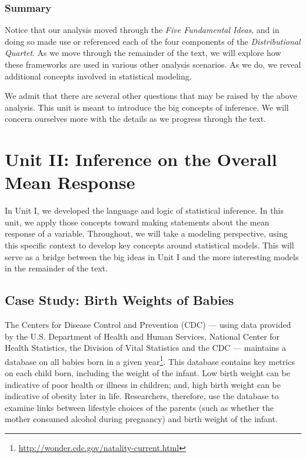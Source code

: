 \documentclass[
  letterpaper,
  DIV=11,
  numbers=noendperiod]{scrreprt}
\theoremstyle{plain}
\theoremstyle{definition}
\theoremstyle{definition}
\theoremstyle{remark}
\begin{document}
\hypertarget{summary}{%
\section{Summary}\label{summary}}

Notice that our analysis moved through the \emph{Five Fundamental
Ideas}, and in doing so made use or referenced each of the four
components of the \emph{Distributional Quartet}. As we move through the
remainder of the text, we will explore how these frameworks are used in
various other analysis scenarios. As we do, we reveal additional
concepts involved in statistical modeling.

We admit that there are several other questions that may be raised by
the above analysis. This unit is meant to introduce the big concepts of
inference. We will concern ourselves more with the details as we
progress through the text.

\part{Unit II: Inference on the Overall Mean Response}

In Unit I, we developed the language and logic of statistical inference.
In this unit, we apply those concepts toward making statements about the
mean response of a variable. Throughout, we will take a modeling
perspective, using this specific context to develop key concepts around
statistical models. This will serve as a bridge between the big ideas in
Unit I and the more interesting models in the remainder of the text.

\hypertarget{sec-casebabies}{%
\chapter{Case Study: Birth Weights of Babies}\label{sec-casebabies}}

The Centers for Disease Control and Prevention (CDC) --- using data
provided by the U.S. Department of Health and Human Services, National
Center for Health Statistics, the Division of Vital Statistics and the
CDC --- maintains a database on all babies born in a given
year\footnote{\url{http://wonder.cdc.gov/natality-current.html}}. This
database contains key metrics on each child born, including the weight
of the infant. Low birth weight can be indicative of poor health or
illness in children; and, high birth weight can be indicative of obesity
later in life. Researchers, therefore, use the database to examine links
between lifestyle choices of the parents (such as whether the mother
consumed alcohol during pregnancy) and birth weight of the infant.
\end{document}
